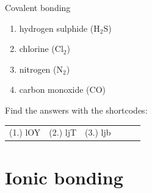 \begin{exercises}{Covalent bonding
        }
\begin{enumerate}[noitemsep, label=\textbf{\arabic*}. ]
\label{m38704*id140030}\begin{enumerate}[noitemsep, label=\textbf{\alph*}. ] 
            \label{m38704*uid13}\item hydrogen sulphide ($\text{H}_{2}\text{S}$)
\label{m38704*uid14}\item chlorine ($\text{Cl}_{2}$)
\item nitrogen ($\text{N}_2$)
\item carbon monoxide ($\text{CO}$)
\end{enumerate}
                \end{enumerate}
      \label{m38704*eip-790}
\practiceinfo
\par {} Find the answers with the shortcodes:
 \par \begin{tabular}[h]{cccccc}
 (1.) lOY  &  (2.) ljT  &  (3.) ljb  & \end{tabular}
\end{exercises}

         \section{Ionic bonding}
    \nopagebreak
      \label{m38684*uid54}
